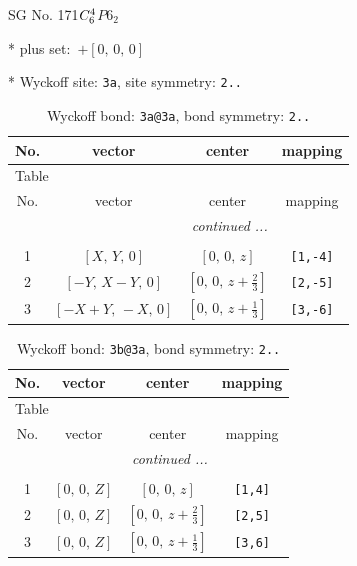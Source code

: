 \documentclass[fleqn,8pt]{jsarticle}
\begin{document}
\setcounter{MaxMatrixCols}{32}

\renewcommand{\tablename}{Table~}
\renewcommand{\figurename}{Figure~}
\begin{center}
\LARGE
SG No. 171\quad$C_{\rm 6}^{4}$\quad$P6_2$\quad[ hexagonal ]
\end{center}

* plus set:\,\,\,$+\left[ 0,\, 0,\, 0 \right]$


* Wyckoff site: {\tt 3a}, site symmetry: {\tt 2..}
\renewcommand{\arraystretch}{1.2}
\begin{longtable}{cccc}
\caption{Wyckoff bond: {\tt 3a@3a}, bond symmetry: {\tt 2..}}
 \\
 \hline \hline
No. & vector & center & mapping \\ \hline \endfirsthead

\multicolumn{3}{l}{\tablename\ \thetable{}} \\
 \hline \hline
No. & vector & center & mapping \\ \hline \endhead

 \hline \hline
\multicolumn{3}{r}{\footnotesize\it continued ...} \\ \endfoot

 \hline \hline
\multicolumn{3}{r}{} \\ \endlastfoot

1 & $\left[ X,\, Y,\, 0 \right]$ & $\left[ 0,\, 0,\, z \right]$ & {\tt [1,-4]} \\ \hline
2 & $\left[ - Y,\, X - Y,\, 0 \right]$ & $\left[ 0,\, 0,\, z + \frac{2}{3} \right]$ & {\tt [2,-5]} \\ \hline
3 & $\left[ - X + Y,\, - X,\, 0 \right]$ & $\left[ 0,\, 0,\, z + \frac{1}{3} \right]$ & {\tt [3,-6]} \\
\end{longtable}
\renewcommand{\arraystretch}{1.2}
\begin{longtable}{cccc}
\caption{Wyckoff bond: {\tt 3b@3a}, bond symmetry: {\tt 2..}}
 \\
 \hline \hline
No. & vector & center & mapping \\ \hline \endfirsthead

\multicolumn{3}{l}{\tablename\ \thetable{}} \\
 \hline \hline
No. & vector & center & mapping \\ \hline \endhead

 \hline \hline
\multicolumn{3}{r}{\footnotesize\it continued ...} \\ \endfoot

 \hline \hline
\multicolumn{3}{r}{} \\ \endlastfoot

1 & $\left[ 0,\, 0,\, Z \right]$ & $\left[ 0,\, 0,\, z \right]$ & {\tt [1,4]} \\ \hline
2 & $\left[ 0,\, 0,\, Z \right]$ & $\left[ 0,\, 0,\, z + \frac{2}{3} \right]$ & {\tt [2,5]} \\ \hline
3 & $\left[ 0,\, 0,\, Z \right]$ & $\left[ 0,\, 0,\, z + \frac{1}{3} \right]$ & {\tt [3,6]} \\
\end{longtable}
\end{document}
